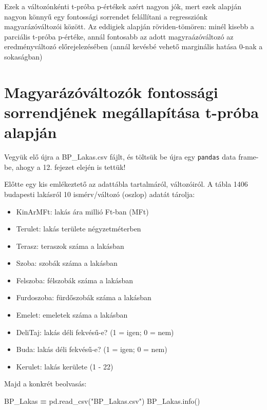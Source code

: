 \documentclass[
]{book}
\newenvironment{Shaded}{\begin{snugshade}}{\end{snugshade}}
\newcommand{\NormalTok}[1]{#1}
\newcommand{\OperatorTok}[1]{\textcolor[rgb]{0.81,0.36,0.00}{\textbf{#1}}}
\newcommand{\StringTok}[1]{\textcolor[rgb]{0.31,0.60,0.02}{#1}}
\providecommand{\tightlist}{%
  \setlength{\itemsep}{0pt}\setlength{\parskip}{0pt}}
\begin{document}
Ezek a változónkénti t-próba p-értékek azért nagyon jók, mert ezek alapján nagyon könnyű egy fontossági sorrendet felállítani a regressziónk magyarázóváltozói között. Az eddigiek alapján röviden-tömören: minél kisebb a parciális t-próba p-értéke, annál fontosabb az adott magyraázóváltozó az eredményváltozó előrejelezésében (annál kevésbé vehető marginális hatása \(0\)-nak a sokaságban)

\section{Magyarázóváltozók fontossági sorrendjének megállapítása t-próba alapján}\label{magyaruxe1zuxf3vuxe1ltozuxf3k-fontossuxe1gi-sorrendjuxe9nek-meguxe1llapuxedtuxe1sa-t-pruxf3ba-alapjuxe1n}

Vegyük elő újra a BP\_Lakas.csv fájlt, és töltsük be újra egy \texttt{pandas} data frame-be, ahogy a 12. fejezet elején is tettük!

Előtte egy kis emlékeztető az adattábla tartalmáról, változóiról. A tábla 1406 budapesti lakásról 10 ismérv/változó (oszlop) adatát tárolja:

\begin{itemize}
\tightlist
\item
  KinArMFt: lakás ára millió Ft-ban (MFt)
\item
  Terulet: lakás területe négyzetméterben
\item
  Terasz: teraszok száma a lakásban
\item
  Szoba: szobák száma a lakásban
\item
  Felszoba: félszobák száma a lakásban
\item
  Furdoszoba: fürdőszobák száma a lakásban
\item
  Emelet: emeletek száma a lakásban
\item
  DeliTaj: lakás déli fekvésű-e? (1 = igen; 0 = nem)
\item
  Buda: lakás déli fekvésű-e? (1 = igen; 0 = nem)
\item
  Kerulet: lakás kerülete (1 - 22)
\end{itemize}

Majd a konkrét beolvasás:

\begin{Shaded}
\begin{Highlighting}[]
\NormalTok{BP\_Lakas }\OperatorTok{=}\NormalTok{ pd.read\_csv(}\StringTok{"BP\_Lakas.csv"}\NormalTok{)}
\NormalTok{BP\_Lakas.info()}
\end{Highlighting}
\end{Shaded}
\end{document}
